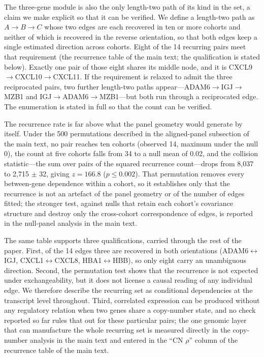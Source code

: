 \documentclass[11pt]{article}
\begin{document}
The three-gene module is also the only length-two path of its kind in the set, a claim we
make explicit so that it can be verified. We define a length-two path as
$A \rightarrow B \rightarrow C$ whose two edges are each recovered in ten or more cohorts
and neither of which is recovered in the reverse orientation, so that both edges keep a
single estimated direction across cohorts. Eight of the 14 recurring pairs meet that
requirement (the recurrence table of the main text; the qualification is stated below). Exactly one pair of
those eight shares its middle node, and it is CXCL9$\rightarrow$CXCL10$\rightarrow$CXCL11.
If the requirement is relaxed to admit the three reciprocated pairs, two further
length-two paths appear---ADAM6$\rightarrow$IGJ$\rightarrow$MZB1 and
IGJ$\rightarrow$ADAM6$\rightarrow$MZB1---but both run through a reciprocated edge. The
enumeration is stated in full so that the count can be verified.

The recurrence rate is far above what the panel geometry would generate by itself. Under the 500 permutations described in the aligned-panel subsection of the main text, no pair reaches ten cohorts (observed 14, maximum under the null 0), the count at five cohorts falls from 34 to a null mean of 0.02, and the collision statistic---the sum over pairs of the squared recurrence count---drops from 8{,}037 to 2{,}715 $\pm$ 32, giving $z = 166.8$ ($p \leq 0.002$). That permutation removes every between-gene dependence within a cohort, so it establishes only that the recurrence is not an artefact of the panel geometry or of the number of edges fitted; the stronger test, against nulls that retain each cohort's covariance structure and destroy only the cross-cohort correspondence of edges, is reported in the null-panel analysis in the main text.

The same table supports three qualifications, carried through the rest of the paper. First, of the 14 edges three are recovered in both orientations (ADAM6$\leftrightarrow$IGJ, CXCL1$\leftrightarrow$CXCL8, HBA1$\leftrightarrow$HBB), so only eight carry an unambiguous direction. Second, the permutation test shows that the recurrence is not expected under exchangeability, but it does not license a causal reading of any individual edge. We therefore describe the recurring set as conditional dependencies at the transcript level throughout. Third, correlated expression can be produced without any regulatory relation when two genes share a copy-number state, and no check reported so far rules that out for these particular pairs; the one genomic layer that can manufacture the whole recurring set is measured directly in the copy-number analysis in the main text and entered in the ``CN $\rho$'' column of the recurrence table of the main text.
\end{document}
